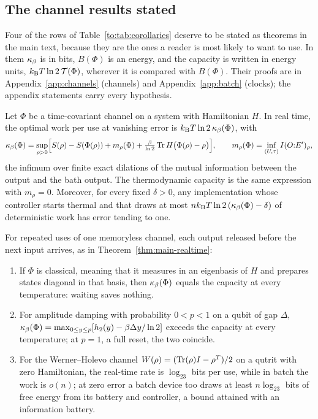 \subsection{The channel results stated}\label{sec:channel-statements}

Four of the rows of Table~\ref{to:tab:corollaries} deserve to be stated as theorems in the main text, because they are the ones a reader is most likely to want to use. In them $\kappa_\beta$ is in bits, $B(\Phi)$ is an energy, and the capacity is written in energy units, $k_{\mathrm B} T\ln2\,\mathcal T(\Phi)$, wherever it is compared with $B(\Phi)$. Their proofs are in Appendix~\ref{app:channels} (channels) and Appendix~\ref{app:batch} (clocks); the appendix statements carry every hypothesis.

\FloatBarrier
\begin{theorem}\label{thm:main-realtime}
Let $\Phi$ be a time-covariant channel on a system with Hamiltonian $H$. In real time, the optimal work per use at vanishing error is $k_{\mathrm B} T\ln2\,\kappa_\beta(\Phi)$, with
\[
\kappa_\beta(\Phi)=\sup_{\rho>0}\Bigl[S(\rho)-S(\Phi(\rho))+m_\rho(\Phi)+\tfrac{\beta}{\ln2}\operatorname{Tr} H\bigl(\Phi(\rho)-\rho\bigr)\Bigr],
\qquad
m_\rho(\Phi)=\inf_{(U,\tau)}I(O{:}E')_\rho,
\]
the infimum over finite exact dilations of the mutual information between the output and the bath output. The thermodynamic capacity is the same expression with $m_\rho=0$. Moreover, for every fixed $\delta>0$, any implementation whose controller starts thermal and that draws at most $nk_{\mathrm B} T\ln2\,(\kappa_\beta(\Phi)-\delta)$ of deterministic work has error tending to one.
\end{theorem}

\begin{theorem}\label{thm:main-dichotomy}
For repeated uses of one memoryless channel, each output released before the next input arrives, as in Theorem~\ref{thm:main-realtime}:
\begin{enumerate}[label=(\alph*),leftmargin=*]
\item If $\Phi$ is classical, meaning that it measures in an eigenbasis of $H$ and prepares states diagonal in that basis, then $\kappa_\beta(\Phi)$ equals the capacity at every temperature: waiting saves nothing.
\item For amplitude damping with probability $0<p<1$ on a qubit of gap $\Delta$, $\kappa_\beta(\Phi)=\max_{0\le y\le p}[h_2(y)-\beta\Delta y/\ln2]$ exceeds the capacity at every temperature; at $p=1$, a full reset, the two coincide.
\item For the Werner--Holevo channel $W(\rho)=(\operatorname{Tr}(\rho)I-\rho^T)/2$ on a qutrit with zero Hamiltonian, the real-time rate is $\log_23$ bits per use, while in batch the work is $o(n)$; at zero error a batch device too draws at least $n\log_23$ bits of free energy from its battery and controller, a bound attained with an information battery.
\end{enumerate}
\end{theorem}

